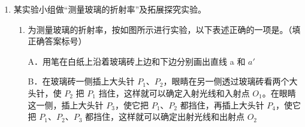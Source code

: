 \documentclass[\gkver]{gaokaozhenti}
\begin{document}
\begin{enumerate}
{解得 $q = \frac{mg}{E}$

故 A 正确；

B．根据洛伦兹力提供向心力

$Bqv = m\frac{v^{2}}{R}$

得 $R = \frac{mv}{Bq}$

解得油滴 a 做圆周运动的速度大小为 $v = \frac{gBR}{E}$

故 B 正确；

C．设小油滴 Ⅰ 的速度大小为 $v_{1}$，得

$3R = \frac{\frac{m}{2}v_{1}}{B\frac{q}{2}}$

解得 $v_{1} = \frac{3BqR}{m} = \frac{3gBR}{E}$

周期为 $T = \frac{2\pi \cdot 3R}{v_{1}} = \frac{2\pi E}{gB}$

故 C 错误；

D．带电油滴 a 分离前后动量守恒，设分离后小油滴 Ⅱ 的速度为 $v_{2}$，取油滴 a 分离前瞬间的速度方向为正方向，得

$mv = \frac{m}{2}v_{1} + \frac{m}{2}v_{2}$

解得 $v_{2} = -\frac{gBR}{E}$

由于分离后的小油滴受到的电场力和重力仍然平衡，分离后小油滴 Ⅱ 的速度方向与正方向相反，根据左手定则可知小油滴 Ⅱ 沿顺时针方向做圆周运动，故 D 正确。

故选 ABD。
}

\item
某实验小组做“测量玻璃的折射率”及拓展探究实验。
\begin{enumerate}
	\item
	为测量玻璃的折射率，按如图所示进行实验，以下表述正确的一项是。（填正确答案标号）

	A．用笔在白纸上沿着玻璃砖上边和下边分别画出直线 a 和 $a'$

	B．在玻璃砖一侧插上大头针 $P_{1}$、$P_{2}$，眼睛在另一侧透过玻璃砖看两个大头针，使 $P_{2}$ 把 $P_{1}$ 挡住，这样就可以确定入射光线和入射点 $O_{1}$。在眼睛这一侧，插上大头针 $P_{3}$，使它把 $P_{1}$、$P_{2}$ 都挡住，再插上大头针 $P_{4}$，使它把 $P_{1}$、$P_{2}$、$P_{3}$ 都挡住，这样就可以确定出射光线和出射点 $O_{2}$


\end{enumerate}
\end{enumerate}
\end{document}

